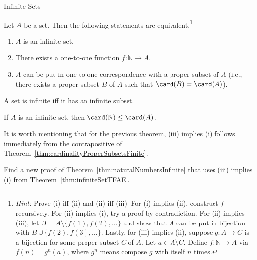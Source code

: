 \begin{section}{Infinite Sets}
\begin{theorem}\label{thm:infiniteSetTFAE}
Let $A$ be a set. Then the following statements are equivalent.\footnote{\emph{Hint:} Prove (i) iff (ii) and (ii) iff (iii). For (i) implies (ii), construct $f$ recursively. For (ii) implies (i), try a proof by contradiction. For (ii) implies (iii), let $B=A\setminus \{f(1),f(2),\ldots\}$ and show that $A$ can be put in bijection with $B\cup\{f(2),f(3),\ldots\}$. Lastly, for (iii) implies (ii), suppose $g:A\to C$ is a bijection for some proper subset $C$ of $A$. Let $a\in A\setminus C$. Define $f:\mathbb{N}\to A$ via $f(n)=g^n(a)$, where $g^n$ means compose $g$ with itself $n$ times.}
\begin{enumerate}[label=\textrm{(\roman*)}]
\item $A$ is an infinite set.
\item There exists a one-to-one function $f:\mathbb{N}\to A$.
\item $A$ can be put in one-to-one correspondence with a proper subset of $A$ (i.e., there exists a proper subset $B$ of $A$ such that $\card(B)=\card(A)$).
\end{enumerate}
\end{theorem}

\begin{corollary}\label{cor:infiniteSetInfiniteSubset}
A set is infinite iff it has an infinite subset.
\end{corollary}

\begin{corollary}
If $A$ is an infinite set, then $\card(\mathbb{N})\leq \card(A)$.
\end{corollary}

It is worth mentioning that for the previous theorem, (iii) implies (i) follows immediately from the contrapositive of Theorem~\ref{thm:cardinalityProperSubsetsFinite}.

\begin{problem}
Find a new proof of Theorem~\ref{thm:naturalNumbersInfinite} that uses (iii) implies (i) from Theorem~\ref{thm:infiniteSetTFAE}.
\end{problem}


\end{section}
